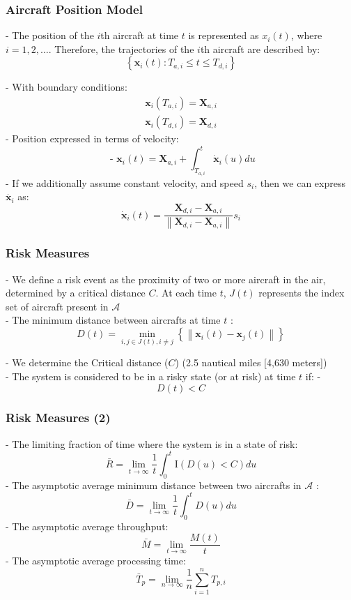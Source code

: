 \documentclass[UKenglish]{beamer}
\begin{document}
\begin{frame}
\frametitle{Aircraft Position Model}
- The position of the \( i \)th aircraft at time \( t \) is represented as \( x_i(t) \), where \( i = 1, 2, \ldots \). Therefore, the trajectories of the \( i \)th aircraft are described by:
$$
\left\{\boldsymbol{x}_i(t): T_{a, i} \leq t \leq T_{d, i}\right\}
$$

- With boundary conditions:
$$
\begin{aligned}
 \boldsymbol{x}_i\left(T_{a, i}\right)=\boldsymbol{X}_{a, i} \\
 \boldsymbol{x}_i\left(T_{d, i}\right)=\boldsymbol{X}_{d, i}
\end{aligned}
$$
- Position expressed in terms of velocity:
$$
\text { - } \boldsymbol{x}_i(t)=\boldsymbol{X}_{a, i}+\int_{T_{a, i}}^t \dot{\boldsymbol{x}}_i(u) d u
$$
- If we additionally assume constant velocity, and speed $s_i$, then we can express $\dot{\boldsymbol{x}_i}$ as:
$$
\dot{\boldsymbol{x}}_i(t)=\frac{\boldsymbol{X}_{d, i}-\boldsymbol{X}_{a, i}}{\left\|\boldsymbol{X}_{d, i}-\boldsymbol{X}_{a, i}\right\|} s_i
$$
\end{frame}
\begin{frame}
\frametitle{Risk Measures}
- We define a risk event as the proximity of two or more aircraft in the air, determined by a critical distance \( C \). At each time \( t \), \( J(t) \) represents the index set of aircraft present in \( \mathcal{A} \)
\vspace{5mm}\\ 
- The minimum distance between aircrafts at time $t$ :
 $$D(t)=\min _{i, j \in J(t), i \neq j}\left\{\left\|\boldsymbol{x}_i(t)-\boldsymbol{x}_j(t)\right\|\right\}$$
 
- We determine the Critical distance ($C$) (2.5 nautical miles [4,630 meters])
\vspace{5mm}\\
- The system is considered to be in a risky state (or at risk) at time $t$ if:
- $$D(t)<C$$
\end{frame}
\begin{frame}
\frametitle{Risk Measures (2)}
- The limiting fraction of time where the system is in a state of risk:
$$\bar{R}=\lim _{t \rightarrow \infty} \frac{1}{t} \int_0^t \mathrm{I}(D(u)<C) d u$$
- The asymptotic average minimum distance between two aircrafts in $\mathcal{A}$ :
 $$\bar{D}=\lim _{t \rightarrow \infty} \frac{1}{t} \int_0^t D(u) d u$$
- The asymptotic average throughput:
$$\bar{M}=\lim _{t \rightarrow \infty} \frac{M(t)}{t}$$
- The asymptotic average processing time:
$$\bar{T}_p=\lim _{n \rightarrow \infty} \frac{1}{n} \sum_{i=1}^n T_{p, i}$$
\end{frame}
\end{document}
